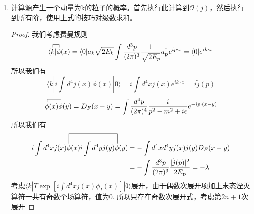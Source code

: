 \documentclass[a4paper]{article}
\newtheorem{proof}{答案}[section]
\begin{document}
\begin{enumerate}
\begin{proof}
\begin{center}
\begin{tikzpicture}
            \end{tikzpicture}$=(2n-1)!!(-\lambda)^n$
        \end{center}
        其中由于对称性，对称重复计算的对称因子为$(2n-1)!!$. 所以总的跃迁振幅为
        \begin{equation}
            \langle 0|T\exp[i\int d^4x j(x)\phi_I(x)]|0\rangle=1-\frac{1}{2!}\lambda+\frac{1}{4!}3\lambda+\cdots+\frac{1}{(2n)!}(2n-1)!!(-\lambda)^n=\sum_{n=0}\frac{(-\frac{\lambda}{2})^n}{n!}=e^{-\frac{\lambda}{2}}
        \end{equation}
        所以$P(0)=e^{-\lambda}$
    \end{proof}
    \item 计算源产生一个动量为k的粒子的概率。首先执行此计算到$\mathcal{O}(j)$，然后执行到所有阶，使用上式的技巧对级数求和。
    \begin{proof}
        我们考虑费曼规则
        \begin{equation}
            \begin{split}
                \contraction{\langle}{k}{|}{\phi}\langle k|\phi(x)=\langle 0|a_k\sqrt{2E_k}\int\frac{d^3p}{(2\pi)^3}\frac{1}{\sqrt{2E_p}}a_\mathbf{p}^\dagger e^{ip\cdot x}=\langle 0|e^{ik\cdot x}
            \end{split}
        \end{equation}
        所以我们有
        \begin{equation}
            \langle k|i\int d^4j(x)\phi(x)|0\rangle=i\int d^4x j(x)e^{ik\cdot x}=i\tilde{j}(p)
        \end{equation}
        \begin{equation}
            \contraction{}{\phi}{(x)}{\phi}\phi(x)\phi(y)=D_F(x-y)=\int\frac{d^4p}{(2\pi)^4}\frac{i}{p^2-m^2+i\epsilon}e^{-ip\cdot (x-y)}
        \end{equation}
        所以我们有
        \begin{equation}
            \begin{split}
                \contraction[1.5em]{i\int d^4xj(x)}{\phi}{(x)i\int d^4yj(y)}{\phi}i\int d^4xj(x)\phi(x)i\int d^4y j(y)\phi(y)&=-\int d^4xd^4y j(x)j(y)D_F(x-y)\\
                &=-\int\frac{d^3p}{(2\pi)^3}\frac{|\tilde{j}(p)|^2}{2E_\mathbf{p}}=-\lambda
            \end{split}
        \end{equation}
        考虑$\langle k|T\exp[i\int d^4x j(x)\phi_I(x)]|0\rangle$展开，由于偶数次展开项加上末态湮灭算符一共有奇数个场算符，值为$0$. 所以只存在奇数次展开式，考虑第$2n+1$次展开

\end{proof}
\end{enumerate}
\end{document}
